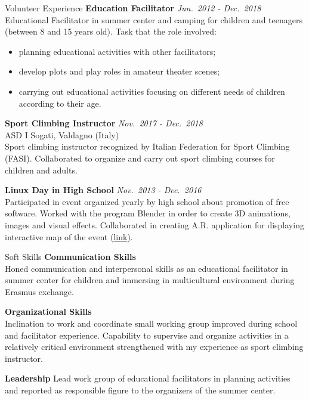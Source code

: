 \documentclass{resume} %
\begin{document}
\begin{rSection}{Volunteer Experience}
    {\bf Education Facilitator}
    \hfill{\em Jun.~2012 - Dec.~2018}
    \\ Educational Facilitator in summer center and camping for children and teenagers (between 8 and 15 years old). Task that the role involved:
    \begin{itemize}
        \item planning educational activities with other facilitators;
        \item develop plots and play roles in amateur theater scenes;
        \item carrying out educational activities focusing on different needs of children according to their age.
    \end{itemize}

    {\bf Sport Climbing Instructor}
    \hfill {\em Nov.~2017 - Dec.~2018}\\
    ASD I Sogati, Valdagno (Italy) \\
    Sport climbing instructor recognized by Italian Federation for Sport Climbing (FASI). Collaborated to organize and carry out sport climbing courses for children and adults.

    {\bf Linux Day in High School}
    \hfill {\em Nov.~2013 - Dec.~2016}\\
    Participated in event organized yearly by high school about promotion of free software. Worked with the program Blender in order to create 3D animations, images and visual effects. Collaborated in creating A.R. application for displaying interactive map of the event (\href{https://play.google.com/store/apps/details?id=it.itismarzotto.armaps&hl=it}{link}).

\end{rSection}

\begin{rSection}{Soft Skills}
    {\bf Communication Skills}\\
    Honed communication and interpersonal skills as an educational facilitator in summer center for children and immersing in multicultural environment during Erasmus exchange. 

    {\bf Organizational Skills}\\
    Inclination to work and coordinate small working group improved during school and facilitator experience.
    Capability to supervise and organize activities in a relatively critical environment strengthened with my experience as sport climbing instructor.

    {\bf Leadership}
    Lead work group of educational facilitators in planning activities and reported as responsible figure to the organizers of the summer center.
\end{rSection}
\end{document}
